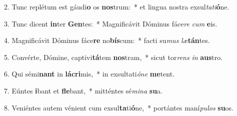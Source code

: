 2. Tunc replétum est gáudi\textbf{o} os \textbf{nos}trum:~*  et lingua nostra exsul\textit{ta}\textit{ti}\textbf{ó}ne.\

3. Tunc dicent \textbf{in}ter \textbf{Gen}tes:~*  Magnificávit Dóminus fáce\textit{re} \textit{cum} \textbf{e}is.\

4. Magnificávit Dóminus fáce\textbf{re} no\textbf{bís}cum:~*  facti su\textit{mus} \textit{læ}\textbf{tán}tes.\

5. Convérte, Dómine, captivi\textbf{tá}tem \textbf{nos}tram,~*  sicut tor\textit{rens} \textit{in} \textbf{aus}tro.\

6. Qui sémi\textbf{nant} in \textbf{lá}\textbf{cri}mis,~*  in exsultati\textit{ó}\textit{ne} \textbf{me}tent.\

7. Eúntes \textbf{i}bant et \textbf{fle}bant,~*  mitténtes sé\textit{mi}\textit{na} \textbf{su}a.\

8. Veniéntes autem vénient cum exsul\textbf{ta}ti\textbf{ó}ne,~*  portántes maní\textit{pu}\textit{los} \textbf{su}os.\

